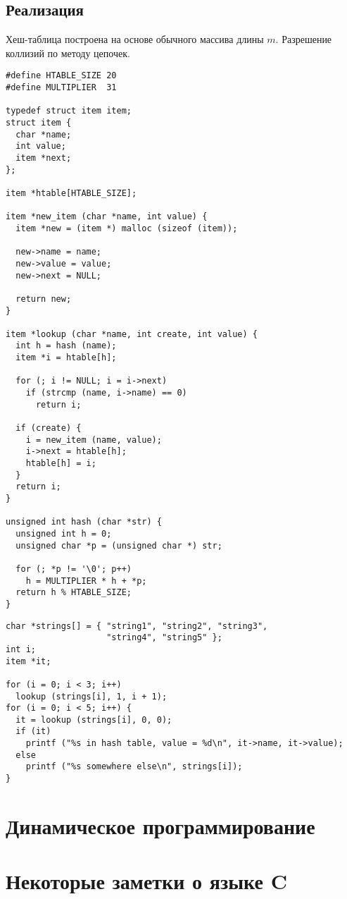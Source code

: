 \subsection{Реализация}
Хеш-таблица построена на основе обычного массива длины $m$. Разрешение коллизий по методу цепочек.

\lstset{label=lst:htable-impl,caption=Некоторые операции}
\begin{lstlisting}
#define HTABLE_SIZE 20
#define MULTIPLIER  31

typedef struct item item;
struct item {
  char *name;
  int value;
  item *next;
};

item *htable[HTABLE_SIZE];

item *new_item (char *name, int value) {
  item *new = (item *) malloc (sizeof (item));

  new->name = name;
  new->value = value;
  new->next = NULL;

  return new;
}

item *lookup (char *name, int create, int value) {
  int h = hash (name);
  item *i = htable[h];

  for (; i != NULL; i = i->next)
    if (strcmp (name, i->name) == 0)
      return i;

  if (create) {
    i = new_item (name, value);
    i->next = htable[h];
    htable[h] = i;
  }
  return i;
}

unsigned int hash (char *str) {
  unsigned int h = 0;
  unsigned char *p = (unsigned char *) str;

  for (; *p != '\0'; p++)
    h = MULTIPLIER * h + *p;
  return h % HTABLE_SIZE;
}
\end{lstlisting}

\lstset{label=lst:htable-usage,caption=Пример использования}
\begin{lstlisting}
char *strings[] = { "string1", "string2", "string3",
                    "string4", "string5" };
int i;
item *it;

for (i = 0; i < 3; i++)
  lookup (strings[i], 1, i + 1);
for (i = 0; i < 5; i++) {
  it = lookup (strings[i], 0, 0);
  if (it)
    printf ("%s in hash table, value = %d\n", it->name, it->value);
  else
    printf ("%s somewhere else\n", strings[i]);
}
\end{lstlisting}

\section{Динамическое программирование}
\label{sec:dyn-programming}

\section{Некоторые заметки о языке C}
\label{sec:c-notes}
